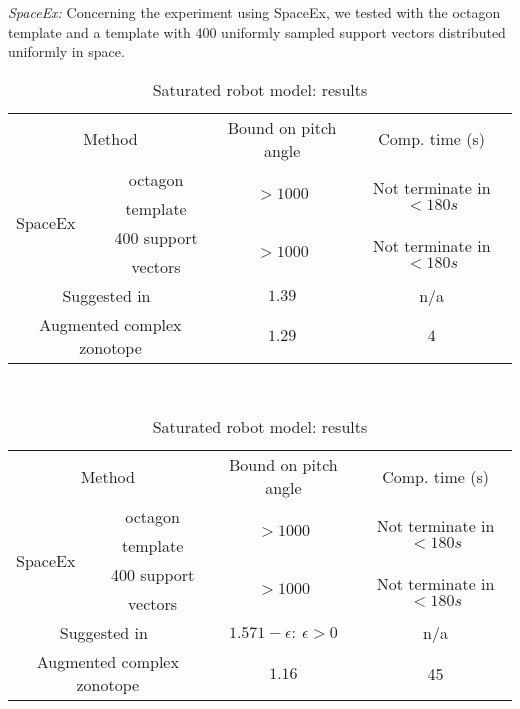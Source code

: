 \emph{SpaceEx:      } Concerning
the experiment using SpaceEx, we tested with the octagon template and
a template with $400$ uniformly sampled support vectors distributed
uniformly in space.  
\begin{table}
\begin{minipage}{1\textwidth}
\centering
\begin{tabular}{|l|c|c|c|}
\hline
\multicolumn{2}{|c|}{\multirow{2}{*}{Method}} &
\multirow{2}{*}{Bound on pitch angle} & \multirow{2}{*}{Comp. time (s)}\\
\multicolumn{2}{|c|}{} & & \\
\hline
\multirow{4}{*}{SpaceEx} & octagon & \multirow{2}{*}{$>1000$} &
\multirow{2}{*}{Not terminate in $<180s$}\\
& template & & \\
\cline{2-4}
& 400 support & \multirow{2}{*}{$>1000$} & \multirow{2}{*}{Not terminate in
  $<180s$}\\
& vectors & &\\
\hline
\multicolumn{2}{|c|}{\multirow{2}{*}{Suggested in~\cite{heinz2014benchmark}}} &
\multirow{2}{*}{$1.39$} & \multirow{2}{*}{n/a}\\
\multicolumn{2}{|c|}{} & &\\
\hline
\multicolumn{2}{|c|}{\multirow{2}{*}{Augmented complex zonotope}} & \multirow{2}{*}{$1.29$} &
\multirow{2}{*}{$4$}\\
\multicolumn{2}{|c|}{} & & \\
\hline
\end{tabular}
\caption{Unsaturated robot model: results}
~\label{tab:robot-unsaturated}
\end{minipage}
{\vspace{1em}
\begin{minipage}{1\textwidth}
\centering
\begin{tabular}{|l|c|c|c|}
\hline
\multicolumn{2}{|c|}{\multirow{2}{*}{Method}} &
\multirow{2}{*}{Bound on pitch angle} & \multirow{2}{*}{Comp. time (s)}\\
\multicolumn{2}{|c|}{} & & \\
\hline
\multirow{4}{*}{SpaceEx} & octagon & \multirow{2}{*}{$>1000$} &
\multirow{2}{*}{Not terminate in $<180s$}\\
& template & & \\
\cline{2-4}
& 400 support & \multirow{2}{*}{$>1000$} & \multirow{2}{*}{Not terminate in $<180s$}\\
& vectors & & \\
\hline
\multicolumn{2}{|c|}{\multirow{2}{*}{Suggested in~\cite{heinz2014benchmark}}} &
\multirow{2}{*}{$1.571-\epsilon:~\epsilon>0$} & \multirow{2}{*}{n/a}\\
\multicolumn{2}{|c|}{} &  &\\
\hline
\multicolumn{2}{|c|}{\multirow{2}{*}{Augmented complex zonotope}} & \multirow{2}{*}{$1.16$} &
\multirow{2}{*}{45}\\
\multicolumn{2}{|c|}{} & &\\
\hline
\end{tabular}
\caption{Saturated robot model: results}
~\label{tab:robot-saturated}
\end{minipage}
}
\end{table}


